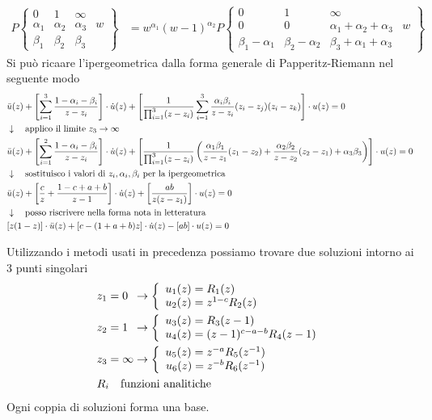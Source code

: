 \begin{align}
	P\left\{\begin{matrix}
		0 & 1 & \infty & \\
		\alpha_1 & \alpha_2 & \alpha_3& w\\
		\beta_1 & \beta_2 & \beta_3 & 
	\end{matrix}\right\} &= w^{\alpha_1}(w-1)^{\alpha_2}P\left\{\begin{matrix}
		0 & 1 & \infty & \\
		0 & 0 &  \alpha_1 + \alpha_2 + \alpha_3& w\\
		\beta_1-\alpha_1 & \beta_2-\alpha_2 & \beta_3 + \alpha_1  + \alpha_3& 
	\end{matrix}\right\}
\end{align}
Si può ricaare l'ipergeometrica dalla forma generale di Papperitz-Riemann nel seguente modo
\begin{align}
	&\ddot{u}(z) + \left[\sum_{i=1}^3\frac{1-\alpha_i - \beta_i}{z-z_i}\right]\cdot \dot{u}(z) + \left[\frac{1}{\prod_{i=1}^3(z-z_i)}\sum_{i=1}^3\frac{\alpha_i\beta_i}{z-z_i}(z_i-z_j)(z_i-z_k)\right] \cdot u(z)=0\\ &\downarrow \quad \text{applico il limite $z_3 \rightarrow \infty$} \nonumber \\	
	&\ddot{u}(z) + \left[\sum_{i=1}^2\frac{1-\alpha_i - \beta_i}{z-z_i}\right]\cdot \dot{u}(z) + \left[\frac{1}{\prod_{i=1}^3(z-z_i)}\left(\frac{\alpha_1\beta_1}{z-z_1}(z_1-z_2) + \frac{\alpha_2\beta_2}{z-z_2}(z_2-z_1) + \alpha_3\beta_3\right)\right] \cdot u(z)=0\nonumber \\ &\downarrow \quad \text{sostituisco i valori di $z_i,\alpha_i,\beta_i$ per la ipergeometrica} \nonumber \\
	&\ddot{u}(z) + \left[\frac{c}{z} + \frac{1-c+a+b}{z-1}\right]\cdot \dot{u}(z) + \left[\frac{ab}{z(z-z_1)}\right] \cdot u(z)=0\nonumber \\ &\downarrow \quad \text{posso riscrivere nella forma nota in letteratura} \nonumber \\
	&[z(1-z)]\cdot \ddot{u}(z)  + [c-(1+a+b)z] \cdot \dot{u}(z) - [ab]\cdot u(z) = 0 \label{ipergeom}
\end{align}

\newpage
{}
Utilizzando i metodi usati in precedenza possiamo trovare due soluzioni intorno ai 3 punti singolari
\begin{align}
	&z_1 = 0 \;\: \to \double{u_1(z) = R_1(z)\hfill}  	       {u_2(z) = z^{1-c}R_2(z)}\\
	&z_2 = 1 \;\: \to \double{u_3(z) = R_3(z-1)\hfill}         {u_4(z) = (z-1)^{c-a-b}R_4(z-1)}\\
	&z_3 = \infty \to \double{u_5(z) = z^{-a}R_5(z^{-1})\hfill}{u_6(z) = z^{-b}R_6(z^{-1})}\\
	&R_i \quad \text{funzioni analitiche}	
\end{align}
Ogni coppia di soluzioni forma una base.

